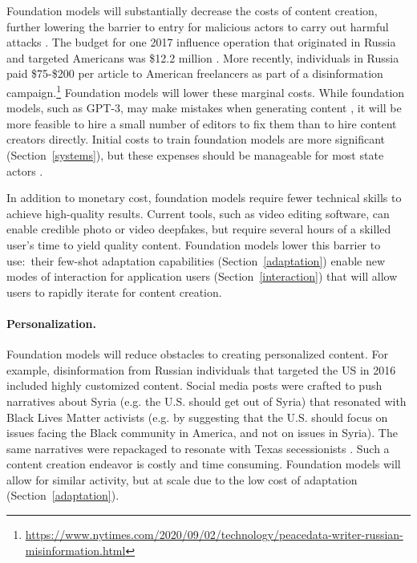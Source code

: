 Foundation models will substantially decrease the costs of content creation, further lowering the barrier to entry for malicious actors to carry out harmful attacks \citep{brundage2018malicious}. The budget for one 2017 influence operation that originated in Russia and targeted Americans was \$12.2 million \citep{DiResta2018TheT}. More recently, individuals in Russia paid \$75-\$200 per article to American freelancers as part of a disinformation campaign.\footnote{\href{https://www.nytimes.com/2020/09/02/technology/peacedata-writer-russian-misinformation.html}{{ https://www.nytimes.com/2020/09/02/technology/peacedata-writer-russian-misinformation.html}}} Foundation models will lower these marginal costs. While foundation models, such as GPT-3, may make mistakes when generating content \citep{BuchananCSET2021}, it will be more feasible to hire a small number of editors to fix them than to hire content creators directly. Initial costs to train foundation models are more significant (Section~\ref{systems}), but these expenses should be manageable for most state actors \citep{BuchananCSET2021}.

In addition to monetary cost, foundation models require fewer technical skills to achieve high-quality results. Current tools, such as video editing software, can enable credible photo or video deepfakes, but require several hours of a skilled user’s time to yield quality content. Foundation models lower this barrier to use:~their few-shot adaptation capabilities (Section~\ref{adaptation}) enable new modes of interaction for application users (Section~\ref{interaction}) that will allow users to rapidly iterate for content creation. 

\paragraph{Personalization.}
Foundation models will reduce obstacles to creating personalized  content. For example, disinformation from Russian individuals that targeted the US in 2016 included highly customized content. Social media posts were crafted to push narratives about Syria (e.g. the U.S. should get out of Syria) that resonated with Black Lives Matter activists \citep{DiResta2018TheT} (e.g. by suggesting that the U.S. should focus on issues facing the Black community in America, and not on issues in Syria). The same narratives were repackaged to resonate with Texas secessionists \citep{diresta2021}. Such a content creation endeavor is costly and time consuming. Foundation models will allow for similar activity, but at scale due to the low cost of adaptation (Section~\ref{adaptation}). 

